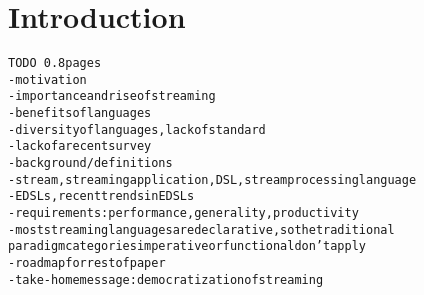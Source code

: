 \section{Introduction}\label{sec:introduction}

\begin{alltt}TODO\scriptsize ~0.8 pages
- motivation
  - importance and rise of streaming
  - benefits of languages
  - diversity of languages, lack of standard
  - lack of a recent survey \cite{stephens_1997} \cite{johnston_hanna_millar_2004}
- background / definitions
  - stream, streaming application, DSL, stream processing language
  - EDSLs \cite{hudak_1998}, recent trends in EDSLs
  - requirements: performance, generality, productivity
  - most streaming languages are declarative, so the traditional
    paradigm categories imperative or functional don't apply
- roadmap for rest of paper
- take-home message: democratization of streaming
\end{alltt}
